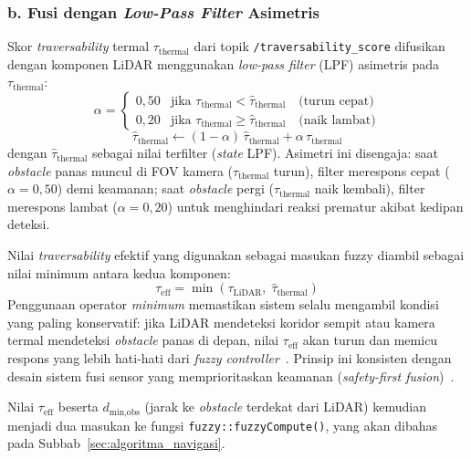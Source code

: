 \subsubsection*{b. Fusi dengan \textit{Low-Pass Filter} Asimetris}

Skor \textit{traversability} termal $\tau_\text{thermal}$ dari topik \texttt{/traversability\_score} difusikan dengan komponen LiDAR menggunakan \textit{low-pass filter} (LPF) asimetris pada $\tau_\text{thermal}$:
\begin{equation}
    \alpha = \begin{cases}
        0{,}50 & \text{jika } \tau_\text{thermal} < \hat{\tau}_\text{thermal} \quad \text{(turun cepat)}\\
        0{,}20 & \text{jika } \tau_\text{thermal} \geq \hat{\tau}_\text{thermal} \quad \text{(naik lambat)}
    \end{cases}
    \label{eq:lpf_alpha}
\end{equation}
\begin{equation}
    \hat{\tau}_\text{thermal} \leftarrow (1 - \alpha)\,\hat{\tau}_\text{thermal} + \alpha\,\tau_\text{thermal}
    \label{eq:lpf_update}
\end{equation}
dengan $\hat{\tau}_\text{thermal}$ sebagai nilai terfilter (\textit{state} LPF). Asimetri ini disengaja: saat \textit{obstacle} panas muncul di FOV kamera ($\tau_\text{thermal}$ turun), filter merespons cepat ($\alpha = 0{,}50$) demi keamanan; saat \textit{obstacle} pergi ($\tau_\text{thermal}$ naik kembali), filter merespons lambat ($\alpha = 0{,}20$) untuk menghindari reaksi prematur akibat kedipan deteksi.

Nilai \textit{traversability} efektif yang digunakan sebagai masukan fuzzy diambil sebagai nilai minimum antara kedua komponen:
\begin{equation}
    \tau_\text{eff} = \min\!\left(\tau_\text{LiDAR},\; \hat{\tau}_\text{thermal}\right)
    \label{eq:trav_eff}
\end{equation}
Penggunaan operator \textit{minimum} memastikan sistem selalu mengambil kondisi yang paling konservatif: jika LiDAR mendeteksi koridor sempit atau kamera termal mendeteksi \textit{obstacle} panas di depan, nilai $\tau_\text{eff}$ akan turun dan memicu respons yang lebih hati-hati dari \textit{fuzzy controller}~\cite{Schichler2025}. Prinsip ini konsisten dengan desain sistem fusi sensor yang memprioritaskan keamanan (\textit{safety-first fusion})~\cite{Haider2022}.

Nilai $\tau_\text{eff}$ beserta $d_\text{min,obs}$ (jarak ke \textit{obstacle} terdekat dari LiDAR) kemudian menjadi dua masukan ke fungsi \texttt{fuzzy::fuzzyCompute()}, yang akan dibahas pada Subbab~\ref{sec:algoritma_navigasi}.